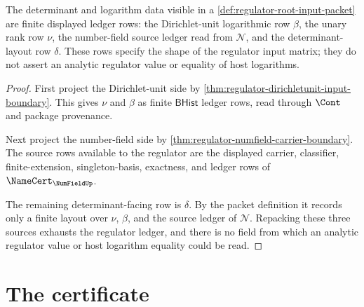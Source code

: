 \begin{theorem}
\label{thm:regulator-ledger-exactness}
The determinant and logarithm data visible in a
\autoref{def:regulator-root-input-packet} are finite displayed ledger rows:
the Dirichlet-unit logarithmic row $\beta$, the unary rank row $\nu$, the
number-field source ledger read from $\mathcal{N}$, and the determinant-layout
row $\delta$. These rows specify the shape of the regulator input matrix; they
do not assert an analytic regulator value or equality of host logarithms.
\end{theorem}
\begin{proof}
First project the Dirichlet-unit side by
\autoref{thm:regulator-dirichletunit-input-boundary}. This gives $\nu$ and
$\beta$ as finite $\mathsf{BHist}$ ledger rows, read through $\Cont$ and
package provenance.

Next project the number-field side by
\autoref{thm:regulator-numfield-carrier-boundary}. The source rows available to
the regulator are the displayed carrier, classifier, finite-extension,
singleton-basis, exactness, and ledger rows of $\NameCert_{\NumFieldUp}$.

The remaining determinant-facing row is $\delta$. By the packet definition it
records only a finite layout over $\nu$, $\beta$, and the source ledger of
$\mathcal{N}$. Repacking these three sources exhausts the regulator ledger, and
there is no field from which an analytic regulator value or host logarithm
equality could be read.
\end{proof}

\section{The certificate}
\label{sec:regulator-certificate}

